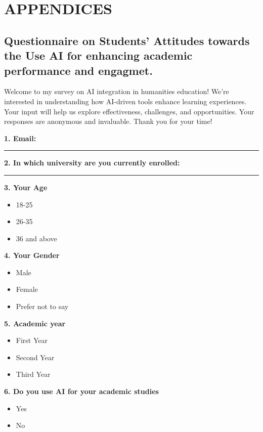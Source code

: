\chapter{APPENDICES}
\begin{Center}
	\section{ Questionnaire on Students' Attitudes towards the Use AI for enhancing academic performance and engagmet.}
	Welcome to my survey on AI integration in humanities education! We're interested
	in understanding how AI-driven tools enhance learning experiences. Your input
	will help us explore effectiveness, challenges, and opportunities. Your
	responses are anonymous and invaluable. Thank you for your time!


\end{Center}

\noindent\textbf{1. Email: }

\noindent\rule{15cm}{0.4pt}

\noindent\textbf{2. In which university are you currently enrolled:}

\noindent\rule{15cm}{0.4pt}



\noindent\textbf{3.  Your Age}
\begin{itemize}
	\item[\checkbox] 18-25
	\item[\checkbox] 26-35
	\item[\checkbox] 36 and above
\end{itemize}

\noindent\textbf{4.  Your Gender}
\begin{itemize}
	\item[\checkbox] Male
	\item[\checkbox] Female
	\item[\checkbox] Prefer not to say
\end{itemize}

\noindent\textbf{5.  Academic year}
\begin{itemize}
	\item[\checkbox] First Year
	\item[\checkbox] Second Year
	\item[\checkbox] Third Year
\end{itemize}

\noindent\textbf{6.  Do you use AI for your academic studies}
\begin{itemize}
	\item[\checkbox] Yes
	\item[\checkbox] No
\end{itemize}


